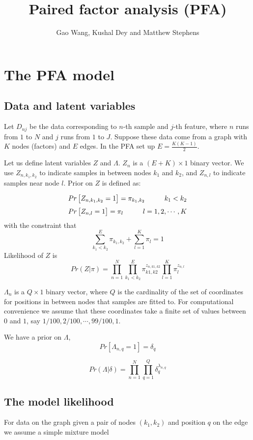 \documentclass[11pt,authoryear]{article}
\begin{document}
\singlespacing
\title{Paired factor analysis (PFA)}
\author{Gao Wang, Kushal Dey and Matthew Stephens}
\maketitle

\section{The PFA model}

\subsection{Data and latent variables}
Let $D_{nj}$ be the data corresponding to $n$-th sample and $j$-th feature, 
where $n$ runs from $1$ to $N$ and $j$ runs from $1$ to $J$.  
Suppose these data come from a graph with $K$ nodes (factors) and $E$ edges. In the
PFA set up $E=\frac{K(K-1)}{2}$.

Let us define latent variables $Z$ and $\Lambda$. $Z_{n}$ is a $(E+K)
\times 1$ binary vector. We use $Z_{n,k_1,k_2}$ to indicate samples in between
nodes $k_1$ and $k_2$, and $Z_{n,l}$ to indicate samples near node $l$. Prior
on $Z$ is defined as:

$$ Pr \left [ Z_{n, k_1, k_2} = 1 \right ] = \pi_{k_1,k_2} \hspace{1 cm} k_1 < k_2$$
$$ Pr \left [ Z_{n, l} = 1 \right ] = \pi_{l} \hspace{1 cm} l=1,2, \cdots, K$$
with the constraint that
$$ \sum_{k_1 < k_2}^E \pi_{k_1, k_2} + \sum_{l=1}^{K} \pi_{l} = 1 $$
Likelihood of $Z$ is
$$  Pr (Z |  \pi )  = \prod_{n=1}^{N} \prod_{k_1 < k_2}^E \pi_{k1,k2}^{z_{n,k1,k2}} \prod_{l=1}^{K} \pi_{l}^{z_{n,l}} $$

$\Lambda_{n}$ is a $Q \times 1$ binary vector, where $Q$ is the cardinality of
the set of coordinates for positions in between nodes that samples are fitted
to. For computational convenience we assume that these coordinates take a finite 
set of values between $0$ and $1$, say $1/100, 2/100, \cdots, 99/100, 1$.

We have a prior on  $\Lambda$,
$$ Pr \left [ \Lambda_{n, q} = 1 \right ] = \delta_{q}  $$

$$  Pr (\Lambda | \delta ) = \prod_{n=1}^{N} \prod_{q=1}^{Q} \delta_{q}^{\lambda_{n,q}} $$

\subsection{The model likelihood}
For data on the graph given a pair of nodes $(k_1, k_2)$ and position $q$ on the
edge we assume a simple mixture model 
\end{document}
